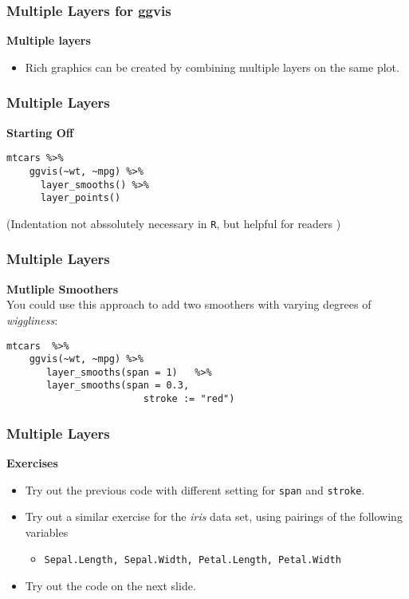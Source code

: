 \documentclass[MASTER.tex]{subfiles}
\begin{document}
 
\begin{frame}[fragile]
	\frametitle{Multiple Layers for ggvis}
	\LARGE
\vspace{-1.5cm}
\textbf{Multiple layers}
\begin{itemize}
\item Rich graphics can be created by combining multiple layers on the same plot. 
\end{itemize}
\end{frame}
\begin{frame}[fragile]
	\frametitle{Multiple Layers}
	\LARGE
	\textbf{Starting Off}
	\begin{framed}
		\begin{verbatim}
mtcars %>% 
    ggvis(~wt, ~mpg) %>% 
      layer_smooths() %>% 
      layer_points()
\end{verbatim}
\end{framed}
{
	\large
(Indentation not abssolutely necessary in \texttt{R}, but helpful for readers )
}
\end{frame}
\begin{frame}[fragile]
\frametitle{Multiple Layers}
\Large
\textbf{Mutliple Smoothers}\\
You could use this approach to add two smoothers with varying degrees of \textit{wiggliness}:
\begin{framed}
\begin{verbatim}
mtcars  %>% 
    ggvis(~wt, ~mpg) %>% 
       layer_smooths(span = 1)   %>% 
       layer_smooths(span = 0.3, 
			            stroke := "red")
\end{verbatim}
\end{framed}
\end{frame}
\begin{frame}[fragile]
	\frametitle{Multiple Layers}
	\Large
	\vspace{-1cm}
	\textbf{Exercises}
	\begin{itemize}
	\item Try out the previous code with different setting for \texttt{span} and \texttt{stroke}.
	\item Try out a similar exercise for the \textit{iris} data set, using pairings of the following variables
		\vspace{0.3cm}
	\begin{itemize}
		\item {\Large \texttt{Sepal.Length, Sepal.Width, Petal.Length, Petal.Width}}
	\end{itemize}
	\item Try out the code on the next slide.
\end{itemize}
\end{frame}
\end{document}
